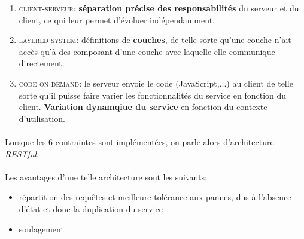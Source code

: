 {\begin{enumerate}
\item\textcolor{ltred}{\textsc{client-serveur}}: \textbf{séparation précise des responsabilités} du serveur et du client, ce qui leur permet d'évoluer indépendamment.

\item\textcolor{ltred}{\textsc{layered system}}: définitions de \textbf{couches}, de telle sorte qu'une couche n'ait accès qu'à des composant d'une couche avec laquelle elle communique directement.

\item\textcolor{ltred}{\textsc{code on demand}}: le serveur envoie le code (JavaScript,...) au client de telle sorte qu'il puisse faire varier les fonctionnalités du service en fonction du client. \textbf{Variation dynamqiue du service} en fonction du contexte d'utilisation. 
\end{enumerate}
\paragraph{}
Lorsque les 6 contraintes sont implémentées, on parle alors d'architecture \textit{RESTful}.

\paragraph{}
Les avantages d'une telle architecture sont les suivants:
\begin{itemize}\setlength{\itemsep}{.2em}
\item[\textcolor{dkgreen}{\ding{52}}]répartition des requêtes et meilleure tolérance aux pannes, dus à l'absence d'état et donc la duplication du service
\item[\textcolor{dkgreen}{\ding{52}}]soulagement 
\end{itemize}
}


\item{}
{}


\item{}
{}


